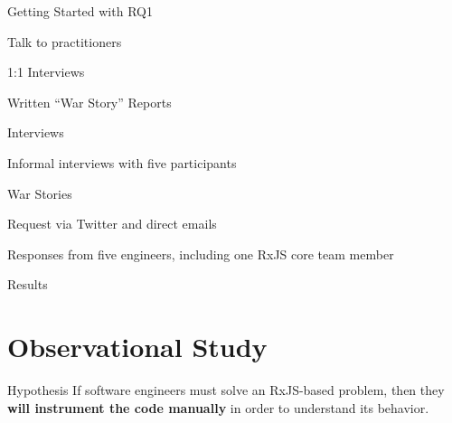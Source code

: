 \documentclass[aspectratio=169]{beamer}
\begin{document}

\begin{frame}[fragile]{Getting Started with RQ1}
	\begin{vfilleditems}
		\item Talk to practitioners
		\item 1:1 Interviews
		\item Written ``War Story'' Reports
	\end{vfilleditems}
\end{frame}


\begin{frame}{Interviews}
	\begin{vfilleditems}
		\item Informal interviews with five participants
	\end{vfilleditems}
\end{frame}

\begin{frame}{War Stories}
	\begin{vfilleditems}
		\item Request via Twitter and direct emails
		\item Responses from five engineers, including one RxJS core team member
	\end{vfilleditems}
\end{frame}

\begin{frame}{Results}

\end{frame}


\section{Observational Study}
\begin{frame}{Hypothesis}
    If software engineers must solve an RxJS-based problem, then they \textbf{will instrument the code manually} in order to understand its behavior.
\end{frame}
\end{document}
